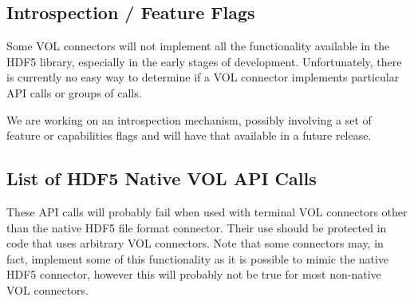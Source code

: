 \subsection{Introspection / Feature Flags}
\thgfuturewarning

Some VOL connectors will not implement all the functionality available in the HDF5 library, especially in the early stages of development. Unfortunately, there is currently no easy way to determine if a VOL connector implements particular API calls or groups of calls.

We are working on an introspection mechanism, possibly involving a set of feature or capabilities flags and will have that available in a future release.

\subsection{List of HDF5 Native VOL API Calls}

These API calls will probably fail when used with terminal VOL connectors other than the native HDF5 file format connector. Their use should be protected in code that uses arbitrary VOL connectors. Note that some connectors may, in fact, implement some of this functionality as it is possible to mimic the native HDF5 connector, however this will probably not be true for most non-native VOL connectors.

